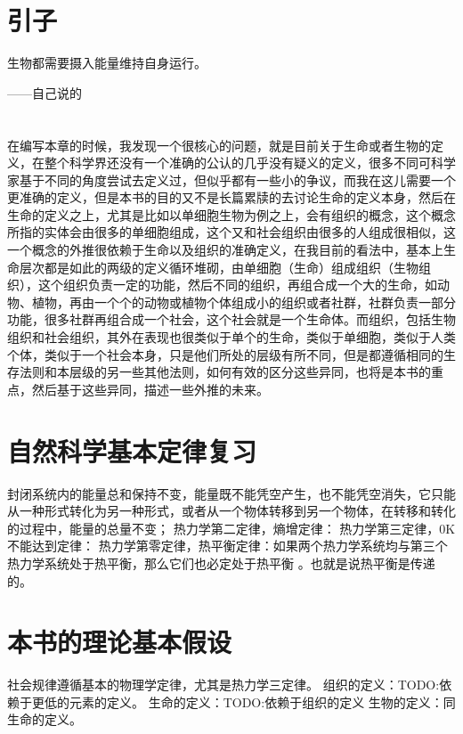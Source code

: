 \section{引子}
生物都需要摄入能量维持自身运行。

\hfill ------自己说的 
\\
\\
\\

在编写本章的时候，我发现一个很核心的问题，就是目前关于生命或者生物的定义，在整个科学界还没有一个准确的公认的几乎没有疑义的定义，很多不同可科学家基于不同的角度尝试去定义过，但似乎都有一些小的争议，而我在这儿需要一个更准确的定义，但是本书的目的又不是长篇累牍的去讨论生命的定义本身，然后在生命的定义之上，尤其是比如以单细胞生物为例之上，会有组织的概念，这个概念所指的实体会由很多的单细胞组成，这个又和社会组织由很多的人组成很相似，这一个概念的外推很依赖于生命以及组织的准确定义，在我目前的看法中，基本上生命层次都是如此的两级的定义循环堆砌，由单细胞（生命）组成组织（生物组织），这个组织负责一定的功能，然后不同的组织，再组合成一个大的生命，如动物、植物，再由一个个的动物或植物个体组成小的组织或者社群，社群负责一部分功能，很多社群再组合成一个社会，这个社会就是一个生命体。而组织，包括生物组织和社会组织，其外在表现也很类似于单个的生命，类似于单细胞，类似于人类个体，类似于一个社会本身，只是他们所处的层级有所不同，但是都遵循相同的生存法则和本层级的另一些其他法则，如何有效的区分这些异同，也将是本书的重点，然后基于这些异同，描述一些外推的未来。

\section{自然科学基本定律复习}
封闭系统内的能量总和保持不变，能量既不能凭空产生，也不能凭空消失，它只能从一种形式转化为另一种形式，或者从一个物体转移到另一个物体，在转移和转化的过程中，能量的总量不变；
\theorem 热力学第二定律，熵增定律：
\theorem 热力学第三定律，0K不能达到定律：
\theorem 热力学第零定律，热平衡定律：如果两个热力学系统均与第三个热力学系统处于热平衡，那么它们也必定处于热平衡 。也就是说热平衡是传递的。


\section{本书的理论基本假设}
\assume  社会规律遵循基本的物理学定律，尤其是热力学三定律。
\assume 组织的定义：TODO:依赖于更低的元素的定义。
\assume 生命的定义：TODO:依赖于组织的定义
\assume 生物的定义：同生命的定义。


